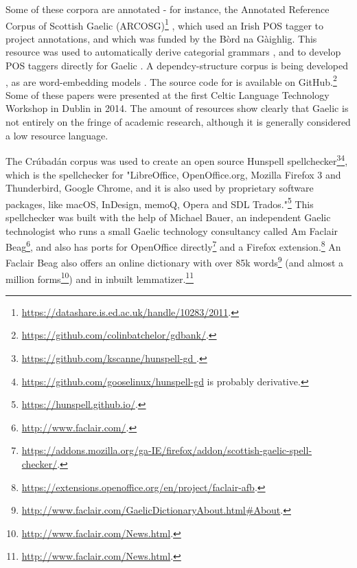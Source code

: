 Some of these corpora are annotated - for instance, the Annotated Reference Corpus of Scottish Gaelic (ARCOSG)\footnote{\href{https://datashare.is.ed.ac.uk/handle/10283/2011}{https://datashare.is.ed.ac.uk/handle/10283/2011}. } \citep{ARCOSG2016, lamb2014scottish}, which used an Irish POS tagger \citep{ui2006part} to project annotations, and which was funded by the B\`ord na G\`aighlig. This resource was used to automatically derive categorial grammars \citep{batchelor2016automatic}, and to develop POS taggers directly for Gaelic \citep{lamb2014developing}. A dependcy-structure corpus is being developed \citep{batchelor2014gdbank}, as are word-embedding models \citep{lamb2016developing}. The source code for \citet{batchelor2014gdbank, batchelor2016automatic} is available on GitHub.\footnote{\href{https://github.com/colinbatchelor/gdbank/}{https://github.com/colinbatchelor/gdbank/}. } Some of these papers were presented at the first Celtic Language Technology Workshop in Dublin in 2014. The amount of resources show clearly that Gaelic is not entirely on the fringe of academic research, although it is generally considered a low resource language.

The Cr\'ubad\'an corpus was used to create an open source Hunspell spellchecker\footnote{\href{https://github.com/kscanne/hunspell-gd }{https://github.com/kscanne/hunspell-gd }. }\footnote{\href{https://github.com/gooselinux/hunspell-gd}{https://github.com/gooselinux/hunspell-gd} is probably derivative. }, which is the spellchecker for "LibreOffice, OpenOffice.org, Mozilla Firefox 3 and Thunderbird, Google Chrome, and it is also used by proprietary software packages, like macOS, InDesign, memoQ, Opera and SDL Trados."\footnote{\href{https://hunspell.github.io/}{https://hunspell.github.io/}. } This spellchecker was built with the help of Michael Bauer, an independent Gaelic technologist who runs a small Gaelic technology consultancy called Am Faclair Beag\footnote{\href{http://www.faclair.com/}{http://www.faclair.com/}. }, and also has ports for OpenOffice directly\footnote{\href{https://addons.mozilla.org/ga-IE/firefox/addon/scottish-gaelic-spell-checker/}{https://addons.mozilla.org/ga-IE/firefox/addon/scottish-gaelic-spell-checker/}. } and a Firefox extension.\footnote{\href{https://extensions.openoffice.org/en/project/faclair-afb}{https://extensions.openoffice.org/en/project/faclair-afb}. } An Faclair Beag also offers an online dictionary with over 85k words\footnote{\href{http://www.faclair.com/GaelicDictionaryAbout.html\#About}{http://www.faclair.com/GaelicDictionaryAbout.html\#About}. }
 (and almost a million forms\footnote{\href{http://www.faclair.com/News.html}{http://www.faclair.com/News.html}. }) and in inbuilt lemmatizer.\footnote{\href{http://www.faclair.com/News.html}{http://www.faclair.com/News.html}. }

